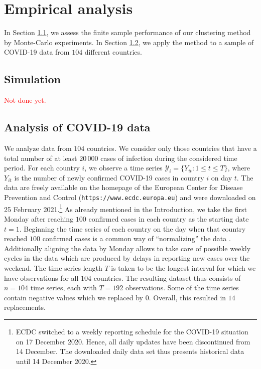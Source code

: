 \documentclass[a4paper,12pt]{article}
\numberwithin{equation}{section}
\begin{document}



\section{Empirical analysis}\label{sec:app}


In Section \ref{subsec:sim}, we assess the finite sample performance of our clustering method by Monte-Carlo experiments. In Section \ref{subsec:app}, we apply the method to a sample of COVID-19 data from $104$ different countries.


\subsection{Simulation}\label{subsec:sim}


\textcolor{red}{Not done yet.} 


\subsection{Analysis of COVID-19 data}\label{subsec:app}




We analyze data from $104$ countries. We consider only those countries that have a total number of at least $20\,000$ cases of infection during the considered time period. For each country $i$, we observe a time series $\mathcal{Y}_i = \{ Y_{it}: 1 \le t \le T \}$, where $Y_{it}$ is the number of newly confirmed COVID-19 cases in country $i$ on day $t$. The data are freely available on the homepage of the European Center for Disease Prevention and Control (\texttt{https://www.ecdc.europa.eu}) and were downloaded on 25 February 2021.\footnote{ECDC switched to a weekly reporting schedule for the COVID-19 situation on 17 December 2020. Hence, all daily updates have been discontinued from 14 December. The downloaded daily data set thus presents historical data until 14 December 2020.} As already mentioned in the Introduction, we take the first Monday after reaching $100$ confirmed cases in each country as the starting date $t=1$. 
Beginning the time series of each country on the day when that country reached $100$ confirmed cases is a common way of ``normalizing'' the data \citep[see e.g.][]{Cohen2020}. Additionally aligning the data by Monday allows to take care of possible weekly cycles in the data which are produced by delays in reporting new cases over the weekend. 
The time series length $T$ is taken to be the longest interval for which we have observations for all $104$ countries. The resulting dataset thus consists of $n = 104$ time series, each with $T = 192$ observations. Some of the time series contain negative values which we replaced by $0$. Overall, this resulted in $14$ replacements.
\end{document}
